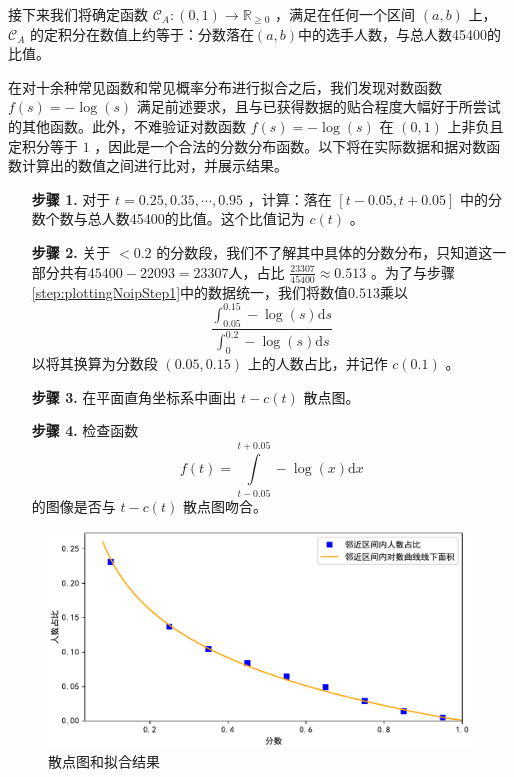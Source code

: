         接下来我们将确定函数 $\mathcal{C}_A:\left(0,1\right)\to\mathbb{R}_{\geq 0}$ ，满足在任何一个区间 $\left(a,b\right)$ 上，$\mathcal{C}_A$ 的定积分在数值上约等于：分数落在$\left(a,b\right)$中的选手人数，与总人数45400的比值。
        
        在对十余种常见函数和常见概率分布进行拟合之后，我们发现对数函数 $f(s)=-\log(s)$ 满足前述要求，且与已获得数据的贴合程度大幅好于所尝试的其他函数。此外，不难验证对数函数 $f(s)=-\log(s)$ 在 $(0,1)$ 上非负且定积分等于 $1$ ，因此是一个合法的分数分布函数。以下将在实际数据和据对数函数计算出的数值之间进行比对，并展示结果。

        \begin{enumerate}[leftmargin=6em]
            \item [\textbf{步骤 1.}] \label{step:plottingNoipStep1} 对于 $t=0.25,0.35,\cdots,0.95$ ，计算：落在 $\left[t-0.05,t+0.05\right]$ 中的分数个数与总人数45400的比值。这个比值记为 $c(t)$ 。
            \item [\textbf{步骤 2.}] 关于 $<0.2$ 的分数段，我们不了解其中具体的分数分布，只知道这一部分共有$45400-22093=23307$人，占比 $\frac{23307}{45400}\approx 0.513$ 。为了与步骤\ref{step:plottingNoipStep1}中的数据统一，我们将数值$0.513$乘以$$\frac{\int_{0.05}^{0.15}-\log(s)\mathrm{d}s}{\int_{0}^{0.2}-\log(s)\mathrm{d}s}$$以将其换算为分数段 $(0.05,0.15)$ 上的人数占比，并记作 $c(0.1)$ 。
            \item [\textbf{步骤 3.}] 在平面直角坐标系中画出 $t-c(t)$ 散点图。
            \item [\textbf{步骤 4.}] 检查函数 $$f(t)=\int\limits_{t-0.05}^{t+0.05}-\log(x)\mathrm{d}x$$ 的图像是否与 $t-c(t)$ 散点图吻合。
        \end{enumerate}

        \begin{figure}[htbp]
            \centering
            \includegraphics[width=\textwidth]{fig/fittingNoipScores.pdf}
            \caption{散点图和拟合结果}
            \label{fig:fittingNoipScoresByLogCurve}
        \end{figure}


